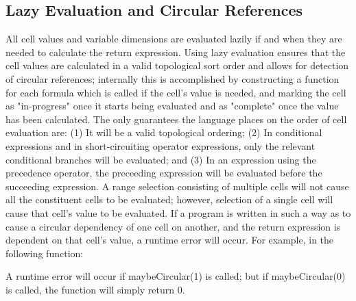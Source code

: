 \subsection{Lazy Evaluation and Circular References}
All cell values and variable dimensions are evaluated lazily if and when they are needed to calculate the return expression. Using lazy evaluation ensures that the cell values are calculated in a valid topological sort order and allows for detection of circular references; internally this is accomplished by constructing a function for each formula which is called if the cell's value is needed, and marking the cell as "in-progress" once it starts being evaluated and as "complete" once the value has been calculated. The only guarantees the language places on the order of cell evaluation are: (1) It will be a valid topological ordering; (2) In conditional expressions and in short-circuiting operator expressions, only the relevant conditional branches will be evaluated; and (3) In an expression using the precedence operator, the preceeding expression will be evaluated before the succeeding expression. A range selection consisting of multiple cells will not cause all the constituent cells to be evaluated; however, selection of a single cell will cause that cell's value to be evaluated.
If a program is written in such a way as to cause a circular dependency of one cell on another, and the return expression is dependent on that cell's value, a runtime error will occur. For example, in the following function:

A runtime error will occur if maybeCircular(1) is called; but if maybeCircular(0) is called, the function will simply return 0.
